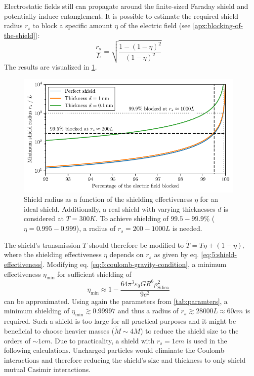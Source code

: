 Electrostatic fields still can propagate around the finite-sized Faraday shield and potentially induce entanglement.
It is possible to estimate the required shield radius $r_s$ to block a specific amount $\eta$ of the electric field (see \cref{apx:blocking-of-the-shield}):
\begin{equation}\label{eq:5:shield-effectiveness}
  \frac{r_s}{L} = \sqrt{\frac{1-(1-\eta)^2}{(1-\eta)^2}}
\end{equation}
The results are visualized in \cref{fig:5:shield-radius}.
\begin{figure}[!ht]
  \centering
  \includegraphics[width=\textwidth]{./../figures/others/shield-radius.pdf}
  \caption{Shield radius as a function of the shielding effectiveness $\eta$ for an ideal shield. Additionally, a real shield with varying thicknesses $d$ is considered at $T=300\si{K}$.
  To achieve shielding of $99.5-99.9\%$ ($\eta = 0.995-0.999$), a radius of $r_s =200-1000L$ is needed.}
  \label{fig:5:shield-radius}
\end{figure}
The shield's transmission $T$ should therefore be modified to $\tilde{T} = T\eta + (1-\eta)$, where the shielding effectiveness $\eta$ depends on $r_s$ as given by eq. \eqref{eq:5:shield-effectiveness}.
Modifying eq. \eqref{eq:5:coulomb-gravity-condition}, a minimum effectiveness $\eta_\mathrm{min}$ for sufficient shielding of
\begin{equation}
  \eta_\mathrm{min} \approx 1 - \frac{64\pi^3 \varepsilon_0 G R^6 \rho^2_\mathrm{Silica}}{9 e^2}
\end{equation}
can be approximated.
Using again the parameters from \cref{tab:paramters}, a minimum shielding of $\eta_\mathrm{min} \gtrsim 0.99997$ and thus a radius of $r_s \gtrsim 28000 L \approx 60\si{cm}$ is required.
Such a shield is too large for all practical purposes and it might be beneficial to choose heavier masses ($\tilde{M} \sim 4 M$) to reduce the shield size to the orders of $\sim 1\si{cm}$.
Due to practicality, a shield with $r_s = 1\si{cm}$ is used in the following calculations.
Uncharged particles would eliminate the Coulomb interactions and therefore reducing the shield's size and thickness to only shield mutual Casimir interactions.




